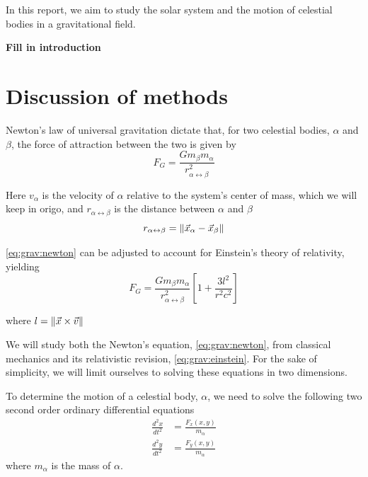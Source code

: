 \documentclass[a4paper]{article}
\begin{document}
In this report, we aim to study the solar system and the motion of celestial bodies in a gravitational field.



\textbf{Fill in introduction}



\section{Discussion of methods}\label{sec:methods}
Newton's law of universal gravitation dictate that, for two celestial bodies, $\alpha$ and $\beta$, the force of attraction between the two is given by
\begin{equation}
F_G
=\frac{Gm_{\beta}m_{\alpha}}{r_{\alpha \leftrightarrow \beta}^2}
\label{eq:grav:newton}
\end{equation}


Here $v_{\alpha}$ is the velocity of $\alpha$ relative to the system's center of mass, which we will keep in origo, and $r_{\alpha \leftrightarrow \beta}$ is the distance between $\alpha$ and $\beta$
\begin{equation}
r_{\alpha \leftrightarrow \beta} = \norm{ \vec{x}_{\alpha} - \vec{x}_{\beta} }
\end{equation}

\ref{eq:grav:newton} can be adjusted to account for Einstein's theory of relativity, yielding
\begin{equation}
F_G
=\frac{Gm_{\beta}m_{\alpha}}{r_{\alpha \leftrightarrow \beta}^2}
\left[1 + \frac{3l^2}{r^2c^2}\right]
\label{eq:grav:einstein}
\end{equation}

where $l = \norm{\vec{x} \times \vec{v}}$

We will study both the Newton's equation, \ref{eq:grav:newton}, from classical mechanics and its relativistic revision, \ref{eq:grav:einstein}. For the sake of simplicity, we will limit ourselves to solving these equations in two dimensions.



To determine the motion of a celestial body, $\alpha$, we need to solve the following two second order ordinary differential equations
\begin{align}
\frac{d^2x}{dt^2} &= \frac{F_x(x,y)}{m_{\alpha}} \label{eq:acc:x}\\
\frac{d^2y}{dt^2} &= \frac{F_y(x,y)}{m_{\alpha}} \label{eq:acc:y}
\end{align}
where $m_{\alpha}$ is the mass of $\alpha$.\\
\end{document}
